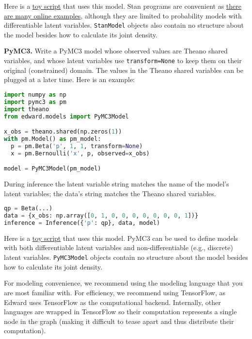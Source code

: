 Here is a
\href{https://github.com/blei-lab/edward/blob/master/examples/stan_beta_bernoulli.py}
{toy script}
that uses this model. Stan programs are convenient as
\href{https://github.com/stan-dev/example-models/wiki}
{there are many online examples},
although they are limited to probability models with differentiable
latent variables. \texttt{StanModel} objects also contain no structure about
the model besides how to calculate its joint density.

\textbf{PyMC3.}
Write a PyMC3 model whose observed values are Theano shared variables,
and whose latent variables use \texttt{transform=None} to keep them on their
original (constrained) domain.
The values in the Theano shared variables can be plugged at a later
time. Here is an example:

\begin{lstlisting}[language=Python]
import numpy as np
import pymc3 as pm
import theano
from edward.models import PyMC3Model

x_obs = theano.shared(np.zeros(1))
with pm.Model() as pm_model:
  p = pm.Beta('p', 1, 1, transform=None)
  x = pm.Bernoulli('x', p, observed=x_obs)

model = PyMC3Model(pm_model)
\end{lstlisting}

During inference the latent variable string matches the name of the
model's latent variables; the data's string matches the Theano shared
variables.

\begin{lstlisting}[language=Python]
qp = Beta(...)
data = {x_obs: np.array([0, 1, 0, 0, 0, 0, 0, 0, 0, 1])}
inference = Inference({'p': qp}, data, model)
\end{lstlisting}

Here is a
\href{https://github.com/blei-lab/edward/blob/master/examples/pymc3_beta_bernoulli.py}
{toy script}
that uses this model. PyMC3 can be used to define models with both
differentiable latent variables and non-differentiable (e.g., discrete)
latent variables. \texttt{PyMC3Model} objects contain no structure about the
model besides how to calculate its joint density.

For modeling convenience, we recommend using the modeling language that
you are most familiar with. For efficiency, we recommend using
TensorFlow, as Edward uses TensorFlow as the computational backend.
Internally, other languages are wrapped in TensorFlow so their
computation represents a single node in the graph (making it difficult
to tease apart and thus distribute their computation).

